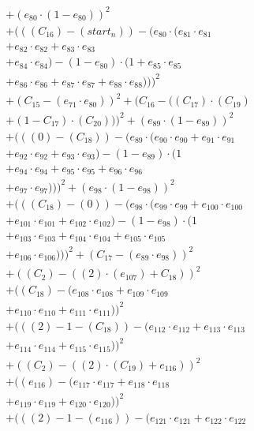 \documentclass[10pt, a4paper]{article}
\begin{document}
\begin{align*}
& + (e_{80} \cdot (1 - e_{80}))^{2} \\
& + (((C_{16}) - (start_n)) - (e_{80} \cdot (e_{81} \cdot e_{81} \\
& + e_{82} \cdot e_{82} + e_{83} \cdot e_{83} \\
& + e_{84} \cdot e_{84}) - (1 - e_{80}) \cdot (1 + e_{85} \cdot e_{85} \\
& + e_{86} \cdot e_{86} + e_{87} \cdot e_{87} + e_{88} \cdot e_{88})))^{2} \\
& + (C_{15} - (e_{71} \cdot e_{80}))^{2} + (C_{16} - ((C_{17})  \cdot  (C_{19}) \\
& + (1 - C_{17})  \cdot  (C_{20})))^{2} + (e_{89} \cdot (1 - e_{89}))^{2} \\
& + (((0) - (C_{18})) - (e_{89} \cdot (e_{90} \cdot e_{90} + e_{91} \cdot e_{91} \\
& + e_{92} \cdot e_{92} + e_{93} \cdot e_{93}) - (1 - e_{89}) \cdot (1 \\
& + e_{94} \cdot e_{94} + e_{95} \cdot e_{95} + e_{96} \cdot e_{96} \\
& + e_{97} \cdot e_{97})))^{2} + (e_{98} \cdot (1 - e_{98}))^{2} \\
& + (((C_{18}) - (0)) - (e_{98} \cdot (e_{99} \cdot e_{99} + e_{100} \cdot e_{100} \\
& + e_{101} \cdot e_{101} + e_{102} \cdot e_{102}) - (1 - e_{98}) \cdot (1 \\
& + e_{103} \cdot e_{103} + e_{104} \cdot e_{104} + e_{105} \cdot e_{105} \\
& + e_{106} \cdot e_{106})))^{2} + (C_{17} - (e_{89} \cdot e_{98}))^{2} \\
& + ((C_{2}) - ((2)  \cdot  (e_{107}) + C_{18}))^{2} \\
& + ((C_{18}) - (e_{108} \cdot e_{108} + e_{109} \cdot e_{109} \\
& + e_{110} \cdot e_{110} + e_{111} \cdot e_{111}))^{2} \\
& + (((2) - 1 - (C_{18})) - (e_{112} \cdot e_{112} + e_{113} \cdot e_{113} \\
& + e_{114} \cdot e_{114} + e_{115} \cdot e_{115}))^{2} \\
& + ((C_{2}) - ((2)  \cdot  (C_{19}) + e_{116}))^{2} \\
& + ((e_{116}) - (e_{117} \cdot e_{117} + e_{118} \cdot e_{118} \\
& + e_{119} \cdot e_{119} + e_{120} \cdot e_{120}))^{2} \\
& + (((2) - 1 - (e_{116})) - (e_{121} \cdot e_{121} + e_{122} \cdot e_{122} \\

\end{align*}
\end{document}
